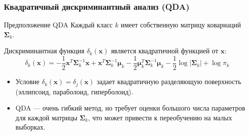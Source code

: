 \documentclass[notheorems, handout]{beamer}
\newcommand{\vect}[1]{\mathbf{#1}}
\newcommand{\matr}[1]{\boldsymbol{#1}}
\begin{document}
\begin{frame}
  \frametitle{Квадратичный дискриминантный анализ (QDA)}
  \begin{block}{Предположение QDA}
    Каждый класс $k$ имеет собственную матрицу ковариаций $\matr{\Sigma}_k$.
  \end{block}

  Дискриминантная функция $\delta_k(\vect{x})$ является квадратичной
  функцией от $\vect{x}$:
  $$ \delta_k(\vect{x}) =
  -\frac{1}{2}\vect{x}^T\matr{\Sigma}_k^{-1}\vect{x} +
  \vect{x}^T\matr{\Sigma}_k^{-1}\matr{\mu}_k -
  \frac{1}{2}\matr{\mu}_k^T\matr{\Sigma}_k^{-1}\matr{\mu}_k
  -\frac{1}{2}\log|\matr{\Sigma}_k| + \log \pi_k $$
  \begin{itemize}
    \item Условие $\delta_k(\vect{x}) = \delta_j(\vect{x})$ задает
      квадратичную разделяющую поверхность (эллипсоид, параболоид, гиперболоид).
    \item QDA --- очень гибкий метод, но требует оценки большого
      числа параметров для каждой матрицы $\matr{\Sigma}_k$, что
      может привести к переобучению на малых выборках.
  \end{itemize}
\end{frame}
\end{document}
